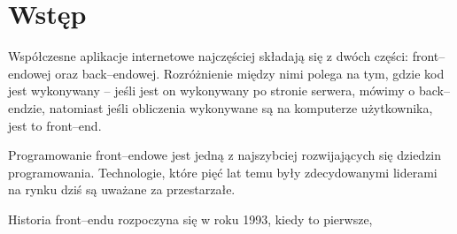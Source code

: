 \documentclass[main.tex]{subfiles}
\begin{document}
\section{Wstęp}
Współczesne aplikacje internetowe najczęściej składają się z dwóch części: front--endowej oraz back--endowej. Rozróżnienie między nimi polega na tym, gdzie kod jest wykonywany -- jeśli jest on wykonywany po stronie serwera, mówimy o back--endzie, natomiast jeśli obliczenia wykonywane są na komputerze użytkownika, jest to front--end.

Programowanie front--endowe jest jedną z najszybciej rozwijających się dziedzin programowania. Technologie, które pięć lat temu były zdecydowanymi liderami na rynku dziś są uważane za przestarzałe.

Historia front--endu rozpoczyna się w roku 1993, kiedy to pierwsze, 
\end{document}
